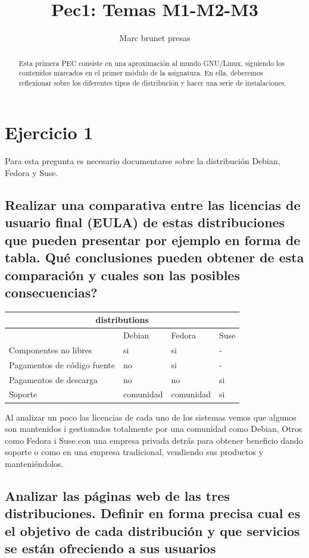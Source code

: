 \documentclass[preprint,11pt]{elsarticle}
\begin{document}
\begin{frontmatter}

    \title{Pec1: Temas M1-M2-M3}
    \author{Marc brunet presas}
    \address{Manresa, Barcelona,}
    \begin{abstract}
    Esta primera PEC consiste en una aproximación al mundo GNU/Linux, siguiendo los contenidos marcados en el primer módulo de la asignatura. En ella, deberemos reflexionar sobre los diferentes tipos de distribución y hacer una serie de instalaciones.

    \end{abstract}
\end{frontmatter}


\section{Ejercicio 1}
\label{S:1}
Para esta pregunta es necesario documentarse sobre la distribución Debian, Fedora y Suse.
\subsection{Realizar una comparativa entre las licencias de usuario final (EULA) de estas distribuciones que pueden presentar por ejemplo en forma de tabla. Qué conclusiones pueden obtener de esta comparación y cuales son las posibles consecuencias?}

\begin{tabular}{ |p{5cm}||p{2cm}|p{2cm}|p{2cm}|  }
 \hline
 \multicolumn{4}{|c|}{distributions} \\
 \hline
  &Debian &Fedora &Suse\\
 \hline
Componentes no libres  &si &si &-\\
Pagamentos de código fuente &no &si &-\\
Pagamentos de descarga &no &no &si\\
Soporte  &comunidad  &comunidad  &si \\
 \hline
\end{tabular}
\bigskip 

Al analizar un poco las licencias de cada uno de los sistemas vemos que algunos son mantenidos i gestionados totalmente por una comunidad como Debian,  Otros como Fedora i Suse con una empresa privada detrás para obtener beneficio dando soporte o como en una empresa tradicional, vendiendo sus productos y manteniéndolos.


\newpage
\subsection{Analizar las páginas web de las tres distribuciones. Definir en forma precisa cual es el objetivo de cada distribución y que servicios se están ofreciendo a sus usuarios}
\label{S:2}
\end{document}
